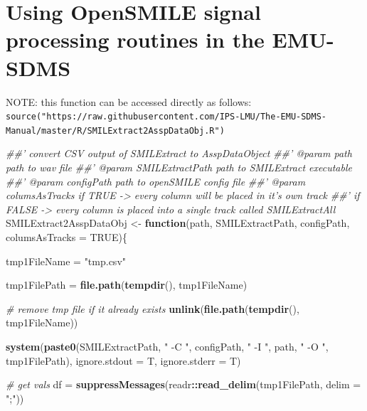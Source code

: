 \documentclass[]{book}
\newenvironment{Shaded}{\begin{snugshade}}{\end{snugshade}}
\newcommand{\CommentTok}[1]{\textcolor[rgb]{0.56,0.35,0.01}{\textit{#1}}}
\newcommand{\ControlFlowTok}[1]{\textcolor[rgb]{0.13,0.29,0.53}{\textbf{#1}}}
\newcommand{\DataTypeTok}[1]{\textcolor[rgb]{0.13,0.29,0.53}{#1}}
\newcommand{\KeywordTok}[1]{\textcolor[rgb]{0.13,0.29,0.53}{\textbf{#1}}}
\newcommand{\NormalTok}[1]{#1}
\newcommand{\OperatorTok}[1]{\textcolor[rgb]{0.81,0.36,0.00}{\textbf{#1}}}
\newcommand{\OtherTok}[1]{\textcolor[rgb]{0.56,0.35,0.01}{#1}}
\newcommand{\StringTok}[1]{\textcolor[rgb]{0.31,0.60,0.02}{#1}}
\begin{document}
\hypertarget{sec:app-chap-wrassp-opensmileSigProc}{%
\section{Using OpenSMILE signal processing routines in the EMU-SDMS}\label{sec:app-chap-wrassp-opensmileSigProc}}

NOTE: this function can be accessed directly as follows: \texttt{source("https://raw.githubusercontent.com/IPS-LMU/The-EMU-SDMS-Manual/master/R/SMILExtract2AsspDataObj.R")}

\begin{Shaded}
\begin{Highlighting}[]
\CommentTok{##' convert CSV output of SMILExtract to AsspDataObject}
\CommentTok{##' @param path path to wav file}
\CommentTok{##' @param SMILExtractPath path to SMILExtract executable}
\CommentTok{##' @param configPath path to openSMILE config file}
\CommentTok{##' @param columsAsTracks if TRUE -> every column will be placed in it's own track}
\CommentTok{##' if FALSE -> every column is placed into a single track called SMILExtractAll}
\NormalTok{SMILExtract2AsspDataObj <-}\StringTok{ }\ControlFlowTok{function}\NormalTok{(path,}
\NormalTok{                                    SMILExtractPath,}
\NormalTok{                                    configPath,}
                                    \DataTypeTok{columsAsTracks =} \OtherTok{TRUE}\NormalTok{)\{}

\NormalTok{  tmp1FileName =}\StringTok{ "tmp.csv"}

\NormalTok{  tmp1FilePath =}\StringTok{ }\KeywordTok{file.path}\NormalTok{(}\KeywordTok{tempdir}\NormalTok{(), tmp1FileName)}

  \CommentTok{# remove tmp file if it already exists}
  \KeywordTok{unlink}\NormalTok{(}\KeywordTok{file.path}\NormalTok{(}\KeywordTok{tempdir}\NormalTok{(), tmp1FileName))}

  \KeywordTok{system}\NormalTok{(}\KeywordTok{paste0}\NormalTok{(SMILExtractPath,}
                \StringTok{" -C "}\NormalTok{, configPath,}
                \StringTok{" -I "}\NormalTok{, path,}
                \StringTok{" -O "}\NormalTok{, tmp1FilePath),}
         \DataTypeTok{ignore.stdout =}\NormalTok{ T,}
         \DataTypeTok{ignore.stderr =}\NormalTok{ T)}

  \CommentTok{# get vals}
\NormalTok{  df =}\StringTok{ }\KeywordTok{suppressMessages}\NormalTok{(readr}\OperatorTok{::}\KeywordTok{read_delim}\NormalTok{(tmp1FilePath,}
                                          \DataTypeTok{delim =} \StringTok{";"}\NormalTok{))}


\end{Highlighting}
\end{Shaded}
\end{document}
